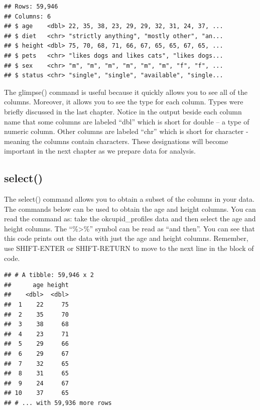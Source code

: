 \documentclass[
]{krantz}
\makeatletter
\newenvironment{Shaded}{\begin{snugshade}}{\end{snugshade}}
\newcommand{\KeywordTok}[1]{\textcolor[rgb]{0.27,0.27,0.27}{\textbf{#1}}}
\newcommand{\NormalTok}[1]{#1}
\newcommand{\OperatorTok}[1]{\textcolor[rgb]{0.43,0.43,0.43}{\textbf{#1}}}
\newcommand{\StringTok}[1]{\textcolor[rgb]{0.5,0.5,0.5}{#1}}
\newenvironment{kframe}{%
\medskip{}
\setlength{\fboxsep}{.8em}
 \def\at@end@of@kframe{}%
 \ifinner\ifhmode%
  \def\at@end@of@kframe{\end{minipage}}%
  \begin{minipage}{\columnwidth}%
 \fi\fi%
 \def\FrameCommand##1{\hskip\@totalleftmargin \hskip-\fboxsep
 \colorbox{shadecolor}{##1}\hskip-\fboxsep
     \hskip-\linewidth \hskip-\@totalleftmargin \hskip\columnwidth}%
 \MakeFramed {\advance\hsize-\width
   \@totalleftmargin\z@ \linewidth\hsize
   \@setminipage}}%
 {\par\unskip\endMakeFramed%
 \at@end@of@kframe}
\renewenvironment{Shaded}{\begin{kframe}}{\end{kframe}}
\makeatother
\begin{document}
\begin{verbatim}
## Rows: 59,946
## Columns: 6
## $ age    <dbl> 22, 35, 38, 23, 29, 29, 32, 31, 24, 37, ...
## $ diet   <chr> "strictly anything", "mostly other", "an...
## $ height <dbl> 75, 70, 68, 71, 66, 67, 65, 65, 67, 65, ...
## $ pets   <chr> "likes dogs and likes cats", "likes dogs...
## $ sex    <chr> "m", "m", "m", "m", "m", "m", "f", "f", ...
## $ status <chr> "single", "single", "available", "single...
\end{verbatim}

The glimpse() command is useful because it quickly allows you to see all of the columns. Moreover, it allows you to see the type for each column. Types were briefly discussed in the last chapter. Notice in the output beside each column name that some columns are labeled ``dbl'' which is short for double -- a type of numeric column. Other columns are labeled ``chr'' which is short for character - meaning the columns contain characters. These designations will become important in the next chapter as we prepare data for analysis.

\hypertarget{select}{%
\subsection{select()}\label{select}}

The select() command allows you to obtain a subset of the columns in your data. The commands below can be used to obtain the age and height columns. You can read the command as: take the okcupid\_profiles data and then select the age and height columns. The ``\%\textgreater\%'' symbol can be read as ``and then''. You can see that this code prints out the data with just the age and height columns. Remember, use SHIFT-ENTER or SHIFT-RETURN to move to the next line in the block of code.

\begin{Shaded}
\end{Shaded}

\begin{verbatim}
## # A tibble: 59,946 x 2
##      age height
##    <dbl>  <dbl>
##  1    22     75
##  2    35     70
##  3    38     68
##  4    23     71
##  5    29     66
##  6    29     67
##  7    32     65
##  8    31     65
##  9    24     67
## 10    37     65
## # ... with 59,936 more rows
\end{verbatim}
\end{document}
